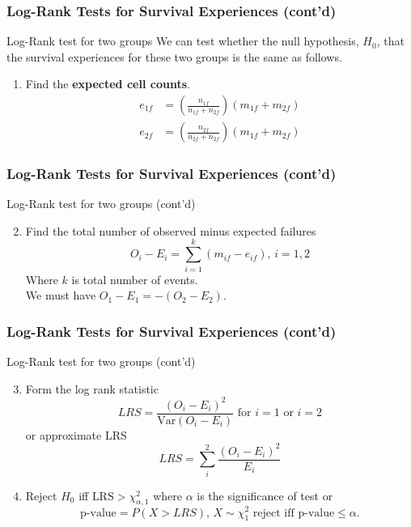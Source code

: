 \documentclass{beamer}
\theoremstyle{definition}
\begin{document}
\begin{frame}
\frametitle{Log-Rank Tests for Survival Experiences (cont'd)}
\begin{block}{Log-Rank test for two groups}
We can test whether the null hypothesis, $H_0$, that the survival experiences for these two groups is the same as follows.
\begin{enumerate}
\item Find the \textbf{expected cell counts}.
\begin{align*}
e_{1f} & = \left(\frac{n_{1f}}{n_{1f} + n_{2f}}\right)(m_{1f} + m_{2f}) \\
e_{2f} & = \left(\frac{n_{2f}}{n_{2f} + n_{2f}}\right)(m_{1f} + m_{2f})
\end{align*}
\end{enumerate}
\end{block}
\end{frame}

\begin{frame}
\frametitle{Log-Rank Tests for Survival Experiences (cont'd)}
\begin{block}{Log-Rank test for two groups (cont'd)}

\begin{enumerate}
 \setcounter{enumi}{1}
\item Find the total number of observed minus expected failures
\[
O_i - E_i = \sum_{i=1}^k (m_{if} - e_{if}), \, i=1,2
\]
Where $k$ is total number of events. \\
We must have $O_1 - E_1 = -(O_2- E_2)$.
\end{enumerate}
\end{block}
\end{frame}

\begin{frame}
\frametitle{Log-Rank Tests for Survival Experiences (cont'd)}
\begin{block}{Log-Rank test for two groups (cont'd)}
 \begin{enumerate}
  \setcounter{enumi}{2}
\item Form the log rank statistic
\[
LRS = \frac{(O_i - E_i)^2}{\text{Var}(O_i-E_i)} \text{ for } i=1 \text{ or } i=2
\]
or approximate LRS
\[
LRS = \sum_i^{2} \frac{(O_i - E_i)^2}{E_i}
\]
\item Reject $H_0$ iff $\text{LRS} > \chi^2_{\alpha,1}$ where $\alpha$ is the significance of test or
\[
\text{p-value} = P(X>LRS), \,  X \sim \chi^2_1 \text{ reject iff p-value} \le \alpha.
\]
\end{enumerate}
\end{block}
\end{frame}
\end{document}
